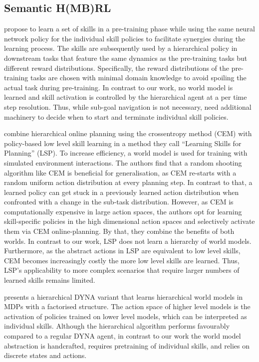 \documentclass{article}
\begin{document}
\subsection{Semantic H(MB)RL}


\citet{florensa2017stochastic} propose to learn a set of skills in a pre-training phase while using the same neural network policy for the individual skill policies to facilitate synergies during the learning process. The skills are subsequently used by a hierarchical policy in downstream tasks that feature the same dynamics as the pre-training tasks but different reward distributions. Specifically, the reward distributions of the pre-training tasks are chosen with minimal domain knowledge to avoid spoiling the actual task during pre-training. In contrast to our work, no world model is learned and skill activation is controlled by the hierarchical agent at a per time step resolution. Thus, while sub-goal navigation is not necessary, \citet{florensa2017stochastic} need additional machinery to decide when to start and terminate individual skill policies.


\citet{xie2021latent} combine hierarchical online planning using the crossentropy method (CEM) with policy-based low level skill learning in a method they call ``Learning Skills for Planning'' (LSP). To increase efficiency, a world model is used for training with simulated environment interactions. The authors find that a random shooting algorithm like CEM is beneficial for generalisation, as CEM re-starts with a random uniform action distribution at every planning step. In contrast to that, a learned policy can get stuck in a previously learned action distribution when confronted with a change in the sub-task distribution. However, as CEM is computationally expensive in large action spaces, the authors opt for learning skill-specific policies in the high dimensional action spaces and selectively activate them via CEM online-planning. By that, they combine the benefits of both worlds. 
In contrast to our work, LSP does not learn a hierarchy of world models. Furthermore, as the abstract actions in LSP are equivalent to low level skills, CEM becomes increasingly costly the more low level skills are learned. Thus, LSP's applicability to more complex scenarios that require larger numbers of learned skills remains limited.

\citet{singh1992reinforcement} presents a hierarchical DYNA \citep{sutton1991dyna} variant that learns hierarchical world models in MDPs with a factorised structure. The action space of higher level models is the activation of policies trained on lower level models, which can be interpreted as individual skills. Although the hierarchical algorithm performs favourably compared to a regular DYNA agent, in contrast to our work the world model abstraction is handcrafted, requires pretraining of individual skills, and relies on discrete states and actions.
\end{document}
